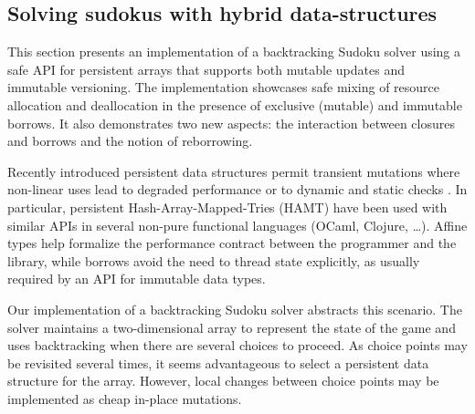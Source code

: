 \subsection{Solving sudokus with hybrid data-structures}

This section presents an implementation of a
backtracking Sudoku solver using a safe API for persistent arrays that
supports both mutable updates and immutable versioning.
The implementation showcases safe mixing of resource allocation and
deallocation in the presence of exclusive (mutable) and immutable
borrows. It also demonstrates two new aspects: the interaction between
closures and borrows and the notion of reborrowing.

Recently introduced persistent data structures
permit transient mutations where
non-linear uses lead to degraded performance
\cite{DBLP:conf/ml/ConchonF07} or to
dynamic and static checks \cite{DBLP:journals/pacmpl/Puente17}.
In particular, persistent Hash-Array-Mapped-Tries (HAMT) have been used with similar
APIs in several non-pure functional languages (OCaml, Clojure, \dots).
Affine types help formalize the performance contract between the programmer
and the library, while borrows avoid the need to thread state explicitly,
as usually required by an API for immutable data types.
%

Our implementation of a backtracking Sudoku solver abstracts this scenario.
The solver maintains a two-dimensional array to represent the state of
the game and uses backtracking when there are several choices to proceed.
As choice points may be revisited several times, it seems advantageous
to select a persistent data structure for the array.
However, local changes between choice points may be implemented as
cheap in-place mutations.

